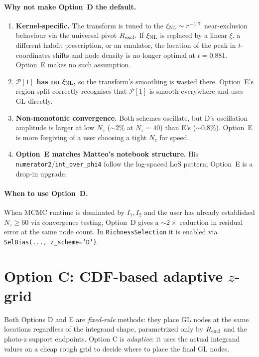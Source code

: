 \documentclass[11pt]{article}
\newcommand{\xinl}{\xi_{\rm NL}}
\newcommand{\Pop}{\mathcal{P}}
\begin{document}
\paragraph{Why not make Option~D the default.}
\begin{enumerate}
  \item \textbf{Kernel-specific.} The transform is tuned to the
        \(\xinl\sim r^{-1.7}\) near-exclusion behaviour via the
        universal pivot \(R_{\rm excl}\). If \(\xinl\) is replaced
        by a linear \(\xi\), a different halofit prescription, or
        an emulator, the location of the peak in
        \(t\)-coordinates shifts and node density is no longer
        optimal at \(t\!=\!0.881\). Option~E makes no such
        assumption.
  \item \textbf{\(\Pop[1]\) has no \(\xinl\),} so the transform's
        smoothing is wasted there. Option~E's region split
        correctly recognises that \(\Pop[1]\) is smooth
        everywhere and uses GL directly.
  \item \textbf{Non-monotonic convergence.} Both schemes oscillate,
        but D's oscillation amplitude is larger at low \(N_z\)
        (\(\sim\!2\%\) at \(N_z\!=\!40\)) than E's
        (\(\sim\!0.8\%\)). Option~E is more forgiving of a
        user choosing a tight \(N_z\) for speed.
  \item \textbf{Option~E matches Matteo's notebook structure.}
        His \texttt{numerator2}/\texttt{int\_over\_phi4} follow the
        log-spaced LoS pattern; Option~E is a drop-in upgrade.
\end{enumerate}

\paragraph{When to use Option~D.}
When MCMC runtime is dominated by \(I_1,I_2\) and the user has
already established \(N_z\!\geq\!60\) via convergence testing,
Option~D gives a \(\sim\!2\times\) reduction in residual error at
the same node count. In
\texttt{RichnessSelection} it is enabled via
\texttt{SelBias(..., z\_scheme='D')}.

\section{Option C: CDF-based adaptive \(z\)-grid}
\label{sec:optionC}

Both Options D and E are \emph{fixed-rule} methods: they place GL
nodes at the same locations regardless of the integrand shape,
parametrized only by \(R_{\rm excl}\) and the photo-z support
endpoints. Option C is \emph{adaptive}: it uses the actual
integrand values on a cheap rough grid to decide where to place
the final GL nodes.
\end{document}
